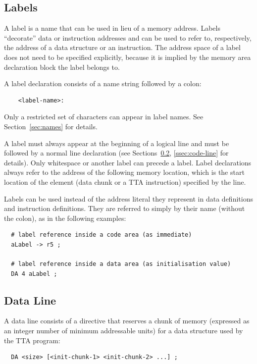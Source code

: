 \documentclass[a4paper,twoside]{tceusermanual}
\begin{document}
\subsection{Labels}
\label{ssec:labels}

A label is a name that can be used in lieu of a memory address.  Labels
``decorate'' data or instruction addresses and can be used to refer to,
respectively, the address of a data structure or an instruction.
%
The address space of a label does not need to be specified explicitly,
because it is implied by the memory area declaration block the label belongs
to.

A label declaration consists of a name string followed by a colon:

\begin{verbatim}
    <label-name>:
\end{verbatim}

Only a restricted set of characters can appear in label names. See
Section~\ref{sec:names} for details.

A label must always appear at the beginning of a logical line and must be
followed by a normal line declaration (see Sections~\ref{ssec:data-line},
\ref{ssec:code-line} for details). Only whitespace or another label can
precede a label. Label declarations always refer to the address of the
following memory location, which is the start location of the element (data
chunk or a TTA instruction) specified by the line.

Labels can be used instead of the address literal they represent in data
definitions and instruction definitions. They are referred to simply by
their name (without the colon), as in the following examples:
\begin{verbatim}
  # label reference inside a code area (as immediate)
  aLabel -> r5 ;

  # label reference inside a data area (as initialisation value)
  DA 4 aLabel ;
\end{verbatim}

\subsection{Data Line}
\label{ssec:data-line}

A data line consists of a directive that reserves a chunk of memory
(expressed as an integer number of minimum addressable units) for a data
structure used by the TTA program:

\begin{verbatim}
  DA <size> [<init-chunk-1> <init-chunk-2> ...] ;
\end{verbatim}
\end{document}
